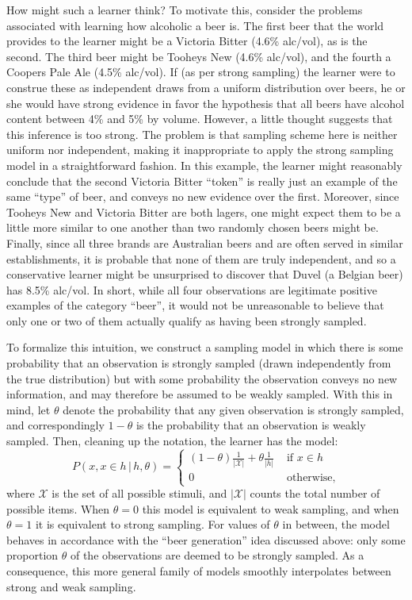\documentclass[doc]{apa6}
\newcommand{\p}{P}
\newcommand{\condon}{\, | \,}
\begin{document}
How might such a learner think? To motivate this, consider the problems associated with learning how alcoholic a beer is. The first beer that the world provides to the learner might be a Victoria Bitter (4.6\% alc/vol), as is the second. The third beer might be Tooheys New (4.6\% alc/vol), and the fourth a Coopers Pale Ale (4.5\% alc/vol). If (as per strong sampling) the learner were to construe these as independent draws from a uniform distribution over beers, he or she would have strong evidence in favor the hypothesis that all beers have alcohol content between 4\% and 5\% by volume. However, a little thought suggests that this inference is too strong. The problem is that sampling scheme here is neither uniform nor independent, making it inappropriate to apply the strong sampling model in a straightforward fashion. In this example, the learner might reasonably conclude that the second Victoria Bitter ``token'' is really just an example of the same ``type'' of beer, and conveys no new evidence over the first. Moreover, since Tooheys New and Victoria Bitter are both lagers, one might expect them to be a little more similar to one another than two randomly chosen beers might be. Finally, since all three brands are Australian beers and are often served in similar establishments, it is probable that none of them are truly independent, and so a conservative learner might be unsurprised to discover that Duvel (a Belgian beer) has 8.5\% alc/vol. In short, while all four observations are legitimate positive examples of the category ``beer'', it would not be unreasonable to believe that only one or two of them actually qualify as having been strongly sampled.

To formalize this intuition, we construct a sampling model in which there is some probability that an observation is strongly sampled (drawn independently from the true distribution) but with some probability the observation conveys no new information, and may therefore be assumed to be weakly sampled. With this in mind, let $\theta$ denote the probability that any given observation is strongly sampled, and correspondingly $1-\theta$ is the probability that an observation is weakly sampled. Then, cleaning up the notation, the learner has the model:
\begin{equation}
\p(x, x \in h \condon  h, \theta) = \left\{ \begin{array}{cl} (1-\theta) \displaystyle\frac{1}{|\mathcal{X}|} + \theta \displaystyle\frac{1}{|h|} & \mbox{ if } x \in h \\ 0 & \mbox{ otherwise,} \end{array} \right. \label{miiixed1}
\end{equation}
where $\mathcal{X}$ is the set of all possible stimuli, and $|\mathcal{X}|$ counts the total number of possible items. When $\theta = 0$ this model is equivalent to weak sampling, and when $\theta = 1$ it is equivalent to strong sampling. For values of $\theta$ in between, the model behaves in accordance with the ``beer generation'' idea discussed above: only some proportion $\theta$ of the observations are deemed to be strongly sampled. As a consequence, this more general family of models smoothly interpolates between strong and weak sampling.
\end{document}
